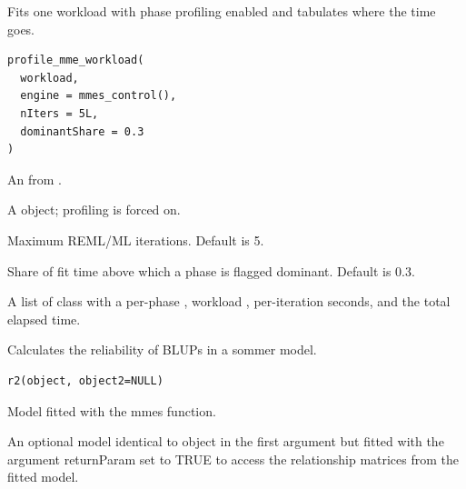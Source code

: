 \documentclass[a4paper]{book}
\begin{document}
%
\begin{Description}\relax
Fits one workload with phase profiling enabled and tabulates where the time goes.
\end{Description}
%
\begin{Usage}
\begin{verbatim}
profile_mme_workload(
  workload,
  engine = mmes_control(),
  nIters = 5L,
  dominantShare = 0.3
)
\end{verbatim}
\end{Usage}
%
\begin{Arguments}
\begin{ldescription}
\item[\code{workload}] An  from .

\item[\code{engine}] A  object; profiling is forced on.

\item[\code{nIters}] Maximum REML/ML iterations. Default is 5.

\item[\code{dominantShare}] Share of fit time above which a phase is flagged dominant. Default is 0.3.
\end{ldescription}
\end{Arguments}
%
\begin{Value}
A list of class  with a per-phase ,
workload , per-iteration seconds, and the total elapsed time.
\end{Value}
%
\begin{Description}\relax
Calculates the reliability of BLUPs in a sommer model.
\end{Description}
%
\begin{Usage}
\begin{verbatim}
r2(object, object2=NULL)
\end{verbatim}
\end{Usage}
%
\begin{Arguments}
\begin{ldescription}
\item[\code{object}] 
Model fitted with the mmes function.

\item[\code{object2}] 
An optional model identical to object in the first argument but fitted with the argument returnParam set to TRUE to access the relationship matrices from the fitted model.

\end{ldescription}
\end{Arguments}
\end{document}
